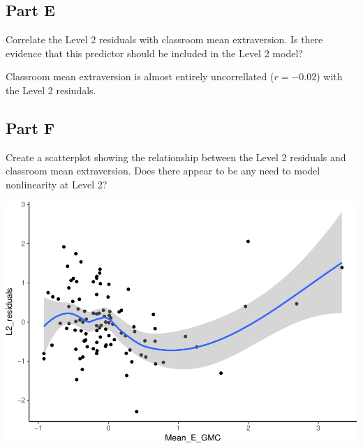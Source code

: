 \documentclass[]{article}
\newenvironment{Shaded}{\begin{snugshade}}{\end{snugshade}}
\newcommand{\KeywordTok}[1]{\textcolor[rgb]{0.13,0.29,0.53}{\textbf{#1}}}
\newcommand{\DataTypeTok}[1]{\textcolor[rgb]{0.13,0.29,0.53}{#1}}
\newcommand{\StringTok}[1]{\textcolor[rgb]{0.31,0.60,0.02}{#1}}
\newcommand{\OperatorTok}[1]{\textcolor[rgb]{0.81,0.36,0.00}{\textbf{#1}}}
\newcommand{\NormalTok}[1]{#1}
\begin{document}
\subsection{Part E}\label{part-e}

Correlate the Level 2 residuals with classroom mean extraversion. Is
there evidence that this predictor should be included in the Level 2
model?

\begin{Shaded}
\end{Shaded}

Classroom mean extraversion is almost entirely uncorrellated
(\(r = -0.02\)) with the Level 2 resiudals.

\subsection{Part F}\label{part-f}

Create a scatterplot showing the relationship between the Level 2
residuals and classroom mean extraversion. Does there appear to be any
need to model nonlinearity at Level 2?

\begin{Shaded}
\end{Shaded}

\includegraphics{Beck_HW_5_R_2_files/figure-latex/unnamed-chunk-12-1.pdf}
\end{document}
